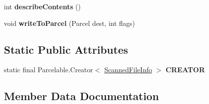 \begin{DoxyCompactItemize}
\item 
\hypertarget{classcom_1_1avira_1_1antivirusimplementation_1_1_scanned_file_info_ab0822c45988cd0da2ce433488e779a84}{}int {\bfseries describe\+Contents} ()\label{classcom_1_1avira_1_1antivirusimplementation_1_1_scanned_file_info_ab0822c45988cd0da2ce433488e779a84}

\item 
\hypertarget{classcom_1_1avira_1_1antivirusimplementation_1_1_scanned_file_info_aa0aa403f0a526dd0aef28d5b8110d7f6}{}void {\bfseries write\+To\+Parcel} (Parcel dest, int flags)\label{classcom_1_1avira_1_1antivirusimplementation_1_1_scanned_file_info_aa0aa403f0a526dd0aef28d5b8110d7f6}

\end{DoxyCompactItemize}
\subsection*{Static Public Attributes}
\begin{DoxyCompactItemize}
\item 
static final Parcelable.\+Creator$<$ \hyperlink{classcom_1_1avira_1_1antivirusimplementation_1_1_scanned_file_info}{Scanned\+File\+Info} $>$ {\bfseries C\+R\+E\+A\+T\+O\+R}
\end{DoxyCompactItemize}


\subsection{Member Data Documentation}
\hypertarget{classcom_1_1avira_1_1antivirusimplementation_1_1_scanned_file_info_a90fc22d7a56a56737a77cad7a6d0bc98}{}
